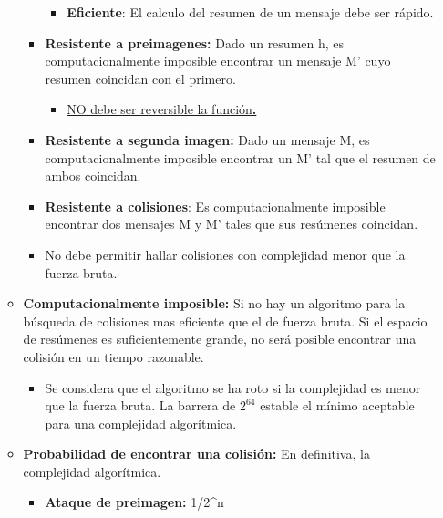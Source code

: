 \documentclass[12pt, twoside, openright]{report} %
\begin{document}
\begin{itemize}
\begin{itemize}
\begin{itemize}
\begin{itemize}
        \item \textbf{Eficiente}: El calculo del resumen de un mensaje debe
          ser rápido.
          
        \end{itemize}
      \item \textbf{Resistente a preimagenes:} Dado un resumen h, es
        computacionalmente imposible encontrar un mensaje M' cuyo
        resumen coincidan con el primero.
        

        \begin{itemize}
        \item \underline{NO debe ser reversible la función\textbf{.}}
          
        \end{itemize}
      \item \textbf{Resistente a segunda imagen:} Dado un mensaje M, es
        computacionalmente imposible encontrar un M' tal que el resumen
        de ambos coincidan.
        
      \item \textbf{Resistente a colisiones}: Es computacionalmente
        imposible encontrar dos mensajes M y M' tales que sus resúmenes
        coincidan.
        
      \item No debe permitir hallar colisiones con complejidad menor que la
        fuerza bruta.
        
      \end{itemize}
    \item \textbf{Computacionalmente imposible:} Si no hay un algoritmo para
      la búsqueda de colisiones mas eficiente que el de fuerza bruta. Si
      el espacio de resúmenes es suficientemente grande, no será posible
      encontrar una colisión en un tiempo razonable.
      

      \begin{itemize}
      \item Se considera que el algoritmo se ha roto si la complejidad es
        menor que la fuerza bruta. La barrera de $2^{64}$ estable el mínimo
        aceptable para una complejidad algorítmica.
        
      \end{itemize}
    \item \textbf{Probabilidad de encontrar una colisión:} En definitiva, la
      complejidad algorítmica.
      

      \begin{itemize}
      \item \textbf{Ataque de preimagen:} 1/2\^{}n
        

\end{itemize}
\end{itemize}
\end{itemize}
\end{document}
